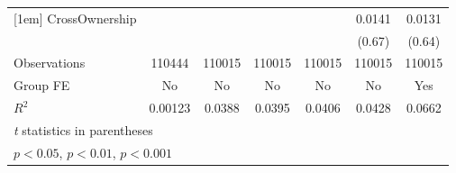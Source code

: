 {\begin{tabular}{l*{6}{c}}
[1em]
CrossOwnership  &                  &                  &                  &                  &   0.0141         &   0.0131         \\
                &                  &                  &                  &                  &   (0.67)         &   (0.64)         \\
\hline
Observations    &   110444         &   110015         &   110015         &   110015         &   110015         &   110015         \\
Group FE        &       No         &       No         &       No         &       No         &       No         &      Yes         \\
$ R^2 $         &  0.00123         &   0.0388         &   0.0395         &   0.0406         &   0.0428         &   0.0662         \\
\hline\hline
\multicolumn{7}{l}{\footnotesize \textit{t} statistics in parentheses}\\
\multicolumn{7}{l}{\footnotesize \sym{*} \(p<0.05\), \sym{**} \(p<0.01\), \sym{***} \(p<0.001\)}\\
\end{tabular}
}

